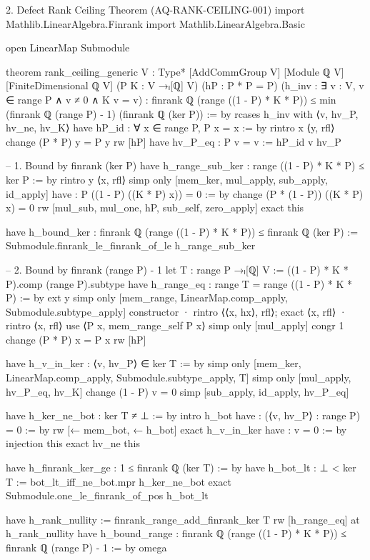 2. Defect Rank Ceiling Theorem (AQ-RANK-CEILING-001)
import Mathlib.LinearAlgebra.Finrank
import Mathlib.LinearAlgebra.Basic

open LinearMap Submodule

theorem rank_ceiling_generic
    {V : Type*} [AddCommGroup V] [Module ℚ V] [FiniteDimensional ℚ V]
    (P K : V →ₗ[ℚ] V)
    (hP : P * P = P)
    (h_inv : ∃ v : V, v ∈ range P ∧ v ≠ 0 ∧ K v = v) :
    finrank ℚ (range ((1 - P) * K * P))
      ≤ min (finrank ℚ (range P) - 1) (finrank ℚ (ker P)) := by
  rcases h_inv with ⟨v, hv_P, hv_ne, hv_K⟩
  have hP_id : ∀ x ∈ range P, P x = x := by
    rintro x ⟨y, rfl⟩
    change (P * P) y = P y
    rw [hP]
  have hv_P_eq : P v = v := hP_id v hv_P

  -- 1. Bound by finrank (ker P)
  have h_range_sub_ker : range ((1 - P) * K * P) ≤ ker P := by
    rintro y ⟨x, rfl⟩
    simp only [mem_ker, mul_apply, sub_apply, id_apply]
    have : P ((1 - P) ((K * P) x)) = 0 := by
      change (P * (1 - P)) ((K * P) x) = 0
      rw [mul_sub, mul_one, hP, sub_self, zero_apply]
    exact this

  have h_bound_ker : finrank ℚ (range ((1 - P) * K * P)) ≤ finrank ℚ (ker P) :=
    Submodule.finrank_le_finrank_of_le h_range_sub_ker

  -- 2. Bound by finrank (range P) - 1
  let T : range P →ₗ[ℚ] V := ((1 - P) * K * P).comp (range P).subtype
  have h_range_eq : range T = range ((1 - P) * K * P) := by
    ext y
    simp only [mem_range, LinearMap.comp_apply, Submodule.subtype_apply]
    constructor
    · rintro ⟨⟨x, hx⟩, rfl⟩; exact ⟨x, rfl⟩
    · rintro ⟨x, rfl⟩
      use ⟨P x, mem_range_self P x⟩
      simp only [mul_apply]
      congr 1
      change (P * P) x = P x
      rw [hP]

  have h_v_in_ker : ⟨v, hv_P⟩ ∈ ker T := by
    simp only [mem_ker, LinearMap.comp_apply, Submodule.subtype_apply, T]
    simp only [mul_apply, hv_P_eq, hv_K]
    change (1 - P) v = 0
    simp [sub_apply, id_apply, hv_P_eq]

  have h_ker_ne_bot : ker T ≠ ⊥ := by
    intro h_bot
    have : (⟨v, hv_P⟩ : range P) = 0 := by
      rw [← mem_bot, ← h_bot]
      exact h_v_in_ker
    have : v = 0 := by
      injection this
    exact hv_ne this

  have h_finrank_ker_ge : 1 ≤ finrank ℚ (ker T) := by
    have h_bot_lt : ⊥ < ker T := bot_lt_iff_ne_bot.mpr h_ker_ne_bot
    exact Submodule.one_le_finrank_of_pos h_bot_lt

  have h_rank_nullity := finrank_range_add_finrank_ker T
  rw [h_range_eq] at h_rank_nullity
  have h_bound_range : finrank ℚ (range ((1 - P) * K * P)) ≤ finrank ℚ (range P) - 1 := by
    omega


